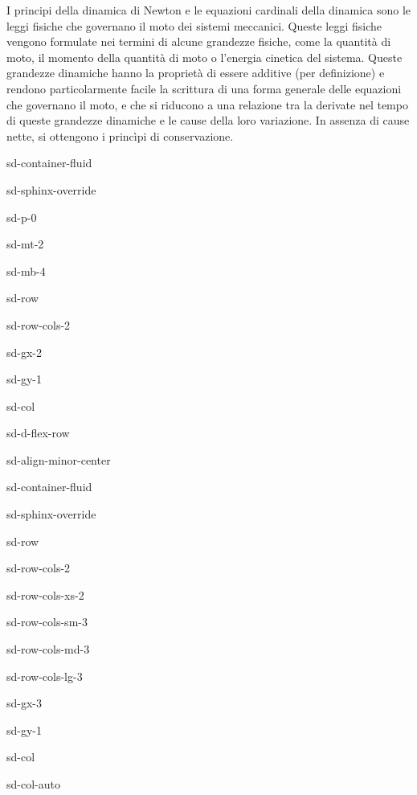 \documentclass[letterpaper,10pt,english]{jupyterBook}
\begin{document}
\sphinxAtStartPar
I principi della dinamica di Newton e le equazioni cardinali della dinamica sono le leggi fisiche che governano il moto dei sistemi meccanici. Queste leggi fisiche vengono formulate nei termini di alcune grandezze fisiche, come la quantità di moto, il momento della quantità di moto o l’energia cinetica del sistema. Queste grandezze dinamiche hanno la proprietà di essere additive (per definizione) e rendono particolarmente facile la scrittura di una forma generale delle equazioni che governano il moto, e che si riducono a una relazione tra la derivate nel tempo di queste grandezze dinamiche e le cause della loro variazione. In assenza di cause nette, si ottengono i princìpi di conservazione.

\sphinxstepscope

\begin{sphinxuseclass}{sd-container-fluid}
\begin{sphinxuseclass}{sd-sphinx-override}
\begin{sphinxuseclass}{sd-p-0}
\begin{sphinxuseclass}{sd-mt-2}
\begin{sphinxuseclass}{sd-mb-4}
\begin{sphinxuseclass}{sd-row}
\begin{sphinxuseclass}{sd-row-cols-2}
\begin{sphinxuseclass}{sd-gx-2}
\begin{sphinxuseclass}{sd-gy-1}
\begin{sphinxuseclass}{sd-col}
\begin{sphinxuseclass}{sd-d-flex-row}
\begin{sphinxuseclass}{sd-align-minor-center}
\begin{sphinxuseclass}{sd-container-fluid}
\begin{sphinxuseclass}{sd-sphinx-override}
\begin{sphinxuseclass}{sd-row}
\begin{sphinxuseclass}{sd-row-cols-2}
\begin{sphinxuseclass}{sd-row-cols-xs-2}
\begin{sphinxuseclass}{sd-row-cols-sm-3}
\begin{sphinxuseclass}{sd-row-cols-md-3}
\begin{sphinxuseclass}{sd-row-cols-lg-3}
\begin{sphinxuseclass}{sd-gx-3}
\begin{sphinxuseclass}{sd-gy-1}
\begin{sphinxuseclass}{sd-col}
\begin{sphinxuseclass}{sd-col-auto}

\end{sphinxuseclass}
\end{sphinxuseclass}
\end{sphinxuseclass}
\end{sphinxuseclass}
\end{sphinxuseclass}
\end{sphinxuseclass}
\end{sphinxuseclass}
\end{sphinxuseclass}
\end{sphinxuseclass}
\end{sphinxuseclass}
\end{sphinxuseclass}
\end{sphinxuseclass}
\end{sphinxuseclass}
\end{sphinxuseclass}
\end{sphinxuseclass}
\end{sphinxuseclass}
\end{sphinxuseclass}
\end{sphinxuseclass}
\end{sphinxuseclass}
\end{sphinxuseclass}
\end{sphinxuseclass}
\end{sphinxuseclass}
\end{sphinxuseclass}
\end{sphinxuseclass}
\end{document}
